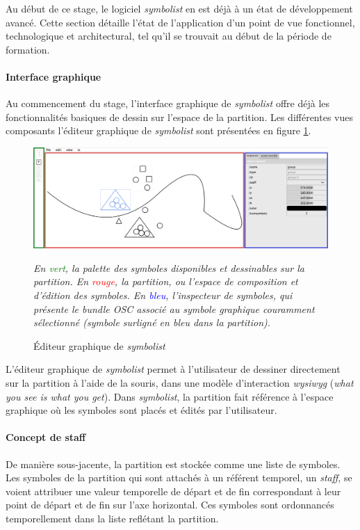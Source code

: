 Au début de ce stage, le logiciel \textit{symbolist} en est déjà à un état de développement avancé. Cette section détaille l'état de l'application d'un point de vue fonctionnel, technologique et architectural, tel qu'il se trouvait au début de la période de formation.

\paragraph{Interface graphique} Au commencement du stage, l'interface graphique de \textit{symbolist} offre déjà les fonctionnalités basiques de dessin sur l'espace de la partition. Les différentes vues composants l'éditeur graphique de \textit{symbolist} sont présentées en figure \ref{fig:symbolistUIBefore}.

\begin{figure}[H]
	\centering
	\includegraphics[keepaspectratio=true, width=\textwidth]{LeProjetSymbolist/i/symbolistUIBefore.png}
	\caption{Éditeur graphique de \textit{symbolist}}
	\label{fig:symbolistUIBefore}
	\small
	\it
	En \textcolor{green}{vert}, la palette des symboles disponibles et dessinables sur la partition. En \textcolor{red}{rouge}, la partition, ou l'espace de composition et d'édition des symboles. En \textcolor{blue}{bleu}, l'inspecteur de symboles, qui présente le bundle OSC associé au symbole graphique couramment sélectionné (symbole surligné en bleu dans la partition).
\end{figure}

L'éditeur graphique de \textit{symbolist} permet à l'utilisateur de dessiner directement sur la partition à l'aide de la souris, dans une modèle d'interaction \textit{wysiwyg} (\textit{what you see is what you get}). Dans \textit{symbolist}, la partition fait référence à l'espace graphique où les symboles sont placés et édités par l'utilisateur. 

\paragraph{Concept de staff} De manière sous-jacente, la partition est stockée comme une liste de symboles. Les symboles de la partition qui sont attachés à un référent temporel, un \textit{staff}, se voient attribuer une valeur temporelle de départ et de fin correspondant à leur point de départ et de fin sur l'axe horizontal. Ces symboles sont ordonnancés temporellement dans la liste reflétant la partition.

